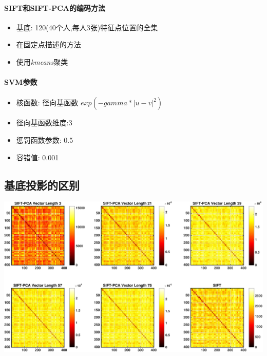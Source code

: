 \paragraph{SIFT和SIFT-PCA的编码方法}
\begin{itemize}
	\item 基底: 120(40个人,每人3张)特征点位置的全集
	\item 在固定点描述的方法
	\item 使用\textit{kmeans}聚类
\end{itemize}

\paragraph{SVM参数}
	\begin{itemize}
		\item 核函数: 径向基函数 $exp(-gamma*|u-v|^2)$
		\item 径向基函数维度:3
		\item 惩罚函数参数: 0.5
		\item 容错值: 0.001
	\end{itemize}



\subsection{基底投影的区别}

			\begin{center}
		\begin{minipage}[t]{\linewidth}
		\center
		{
		\includegraphics[width=1.1\textwidth]{Img/c3/sift_dis_mat} 
		}
		\end{minipage}
		\medskip
		\end{center}
		

